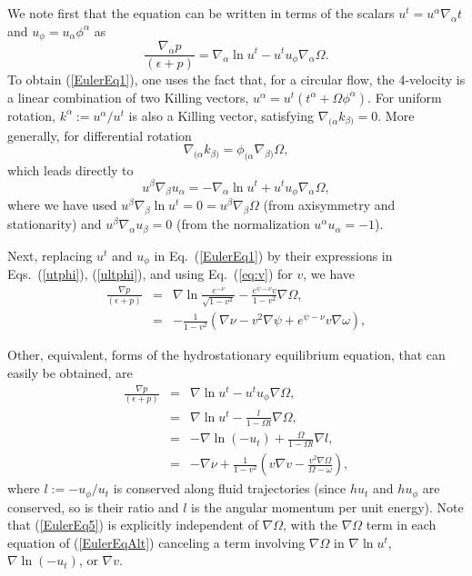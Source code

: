 \documentclass[12pt]{article}
\def\a{\alpha}
\def\be{\begin{equation}}
\def\ee{\end{equation}}
\newcommand{\na}{\nabla}
\def\a{\alpha}
\newcommand{\bsube}{\begin{subequations}}
\newcommand{\esube}{\end{subequations}}
\begin{document}
We note first that the equation can be written in terms of the scalars 
\mbox{$u^t = u^\a\na_\a t$} and $u_\phi = u_\a \phi^\a$ as 
\be
\frac{\nabla_\a  p}{(\epsilon+p)} = \nabla_\a \ln u^t 
 -u^tu_\phi\nabla_\a \Omega. \label{EulerEq1}
\ee
To obtain (\ref{EulerEq1}), one uses the fact that, for a circular flow, 
the 4-velocity is a linear combination of two Killing vectors, 
$u^\alpha = u^t(t^\alpha+\Omega \phi^\alpha)$.
For uniform rotation, $k^\alpha := u^\alpha/u^t$ is also a Killing
vector, satisfying $\nabla_{(\alpha} k_{\beta)}=0$. More generally, for differential 
rotation
\be
\nabla_{(\alpha} k_{\beta )} = \phi_{(\alpha} \nabla_{\beta )} \Omega,
\ee
which leads directly to 
\be
u^\beta \nabla_\beta u_\a = -\nabla_\a \ln u^t +u^tu_\phi\nabla_\a \Omega,
\label{ugradu}\ee
where we have used $u^\beta \nabla_\beta \ln u^t=0=u^\beta \nabla_\beta\Omega$ 
(from axisymmetry and stationarity) and $u^\beta \nabla_\alpha u_\beta =0$ 
(from the normalization $u^\alpha u_\alpha =-1$). 

Next, replacing $u^t$ and $u_\phi$ in Eq.~(\ref{EulerEq1}) by their expressions in 
Eqs.~(\ref{utphi}), (\ref{ultphi}), and using Eq.~(\ref{eq:v}) for $v$, we have 
\begin{eqnarray}
\frac{\nabla  p}{(\epsilon+p)} 
&=& \nabla \ln \frac{e^{-\nu}}{\sqrt{1-v^2}} -\frac{e^{\psi-\nu}v}{1-v^2}\nabla \Omega, 
\nonumber\\
&=& -\frac1{1-v^2} \left(\nabla\nu
         -v^2\nabla\psi +e^{\psi-\nu} v \nabla\omega\right), \label{EulerEq5}
\end{eqnarray}

Other, equivalent, forms of the hydrostationary equilibrium equation, that can
easily be obtained, are 
\bsube
\begin{eqnarray}
\frac{\nabla  p}{(\epsilon+p)} &=& \nabla \ln u^t - u^t u_\phi \nabla \Omega, 
\label{eq:EulerEq1a}\\
&=&  \nabla \ln u^t - \frac{l}{1-\Omega l} \nabla \Omega, \\
&=& -\nabla \ln (-u_t) + \frac{\Omega}{1-\Omega l} \nabla l, \\
&=& -\nabla \nu + \frac{1}{1-v^2} \left( v \nabla v - \frac{v^2\nabla \Omega}
{\Omega-\omega} \right), 
\end{eqnarray}\label{EulerEqAlt}\esube
where $l:=-u_\phi/u_t$ is conserved along fluid trajectories (since $h u_t$
and $h u_\phi$ are conserved, so is their ratio and $l$ is the angular
momentum per unit energy). Note that (\ref{EulerEq5}) is explicitly independent 
of $\nabla \Omega$, with the $\nabla \Omega$ term in each equation of (\ref{EulerEqAlt}) canceling a term involving $\nabla \Omega$ in $\nabla \ln u^t$, 
$\nabla\ln(-u_t)$, or $\nabla v$.
\end{document}
